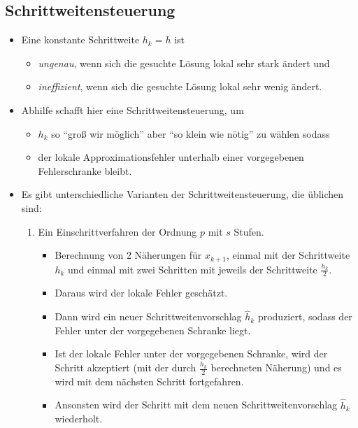         \subsection{Schrittweitensteuerung} %
            \begin{itemize}
            	\item Eine konstante Schrittweite \( h _ k = h \) ist
	            	\begin{itemize}
	            		\item \textit{ungenau}, wenn sich die gesuchte Lösung lokal sehr stark ändert und
	            		\item \textit{ineffizient}, wenn sich die gesuchte Lösung lokal sehr wenig ändert.
	            	\end{itemize}
	            \item Abhilfe schafft hier eine Schrittweitensteuerung, um
		            \begin{itemize}
		            	\item \( h _ k \) so \enquote{groß wir möglich} aber \enquote{so klein wie nötig} zu wählen sodass
		            	\item der lokale Approximationsfehler unterhalb einer vorgegebenen Fehlerschranke bleibt.
		            \end{itemize}
				\item Es gibt unterschiedliche Varianten der Schrittweitensteuerung, die üblichen sind:
					\begin{enumerate}
						\item Ein Einschrittverfahren der Ordnung \( p \) mit \( s \) Stufen.
							\begin{itemize}
								\item Berechnung von 2 Näherungen für \( x _ { k + 1 } \), einmal mit der Schrittweite \( h _ k \) und einmal mit zwei Schritten mit jeweils der Schrittweite \( \frac{h _ k}{2} \).
								\item Daraus wird der lokale Fehler geschätzt.
								\item Dann wird ein neuer Schrittweitenvorschlag \( \hat{h} _ k \) produziert, sodass der Fehler unter der vorgegebenen Schranke liegt.
								\item Ist der lokale Fehler unter der vorgegebenen Schranke, wird der Schritt akzeptiert (mit der durch \( \frac{h _ k}{2} \) berechneten Näherung) und es wird mit dem nächsten Schritt fortgefahren.
								\item Ansonsten wird der Schritt mit dem neuen Schrittweitenvorschlag \( \hat{h} _ k \) wiederholt.

\end{itemize}
\end{enumerate}
\end{itemize}
